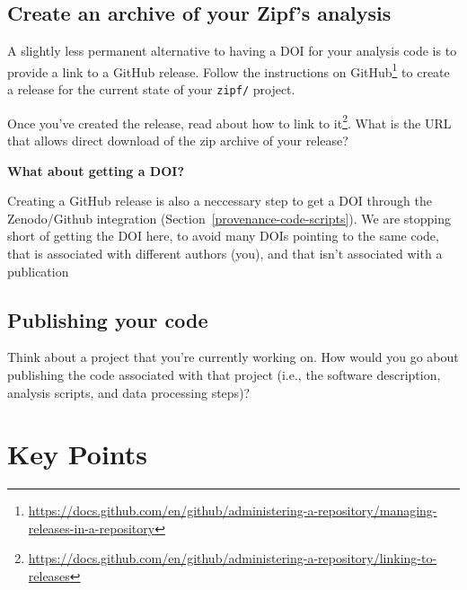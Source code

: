 \documentclass[
]{krantz}
\renewenvironment{quote}{\begin{VF}}{\end{VF}}
\renewcommand{\href}[2]{#2\footnote{\url{#1}}}
\begin{document}
\hypertarget{provenance-ex-release}{%
\subsection{Create an archive of your Zipf's analysis}\label{provenance-ex-release}}

A slightly less permanent alternative to having a DOI for your analysis code
is to provide a link to a GitHub release.
Follow \href{https://docs.github.com/en/github/administering-a-repository/managing-releases-in-a-repository}{the instructions on GitHub} to create a release for the current state of your \texttt{zipf/} project.

Once you've created the release,
\href{https://docs.github.com/en/github/administering-a-repository/linking-to-releases}{read about how to link to it}.
What is the URL that allows direct download of the zip archive
of your release?

\begin{quote}
\textbf{What about getting a DOI?}

Creating a GitHub release is also a neccessary step
to get a DOI through the Zenodo/Github integration
(Section~\ref{provenance-code-scripts}).
We are stopping short of getting the DOI here,
to avoid many DOIs pointing to the same code,
that is associated with different authors (you),
and that isn't associated with a publication
\end{quote}

\hypertarget{provenance-ex-publish-code}{%
\subsection{Publishing your code}\label{provenance-ex-publish-code}}

Think about a project that you're currently working on.
How would you go about publishing the code associated with that project
(i.e., the software description, analysis scripts, and data processing steps)?

\hypertarget{publish-keypoints}{%
\section{Key Points}\label{publish-keypoints}}
\end{document}
